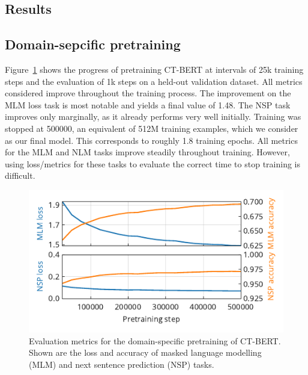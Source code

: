 \documentclass{article}
\begin{document}
\begin{multicols}{2}

\section{Results}
\label{sec:results}

\subsection{Domain-sepcific pretraining}
\label{sec:domain_specific_pretraining}
Figure~\ref{fig:fig1} shows the progress of pretraining \textsc{CT-BERT} at intervals of 25k training steps and the evaluation of 1k steps on a held-out validation dataset.
All metrics considered improve throughout the training process.
The improvement on the MLM loss task is most notable and yields a final value of 1.48.
The NSP task improves only marginally, as it already performs very well initially.
Training was stopped at \num{500000}, an equivalent of \num{512}M training examples, which we consider as our final model.
This corresponds to roughly 1.8 training epochs.
All metrics for the MLM and NLM tasks improve steadily throughout training.
However, using loss/metrics for these tasks to evaluate the correct time to stop training is difficult.

\end{multicols}
\begin{figure}
  \centering
  \includegraphics[]{figures/fig1.pdf}
  \caption{
    Evaluation metrics for the domain-specific pretraining of \textsc{CT-BERT}.
    Shown are the loss and accuracy of masked language modelling (MLM) and next sentence prediction (NSP) tasks.
  }
  \label{fig:fig1}
\end{figure}
\end{document}
